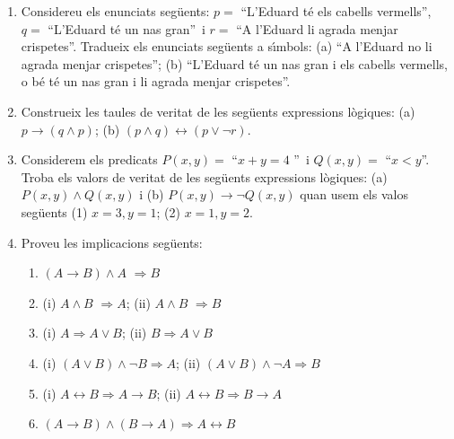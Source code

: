 \begin{enumerate}
\item Considereu els enunciats seg\"{u}ents: $p=$ \textquotedblleft L'Eduard
t\'{e} els cabells vermells\textquotedblright, $q=$ \textquotedblleft L'Eduard
t\'{e} un nas gran\textquotedblright\ i $r=$ \textquotedblleft A l'Eduard li
agrada menjar crispetes\textquotedblright. Tradueix els enunciats seg\"{u}ents
a s\'{\i}mbols: (a) \textquotedblleft A l'Eduard no li agrada menjar
crispetes\textquotedblright; (b) \textquotedblleft L'Eduard t\'{e} un nas gran
i els cabells vermells, o b\'{e} t\'{e} un nas gran i li agrada menjar
crispetes\textquotedblright.

\item Construeix les taules de veritat de les seg\"{u}ents expressions
l\`{o}giques: (a) $p\longrightarrow(q\wedge p)$; (b) $(p\wedge
q)\longleftrightarrow(p\vee\lnot r)$.

\item Considerem els predicats $P(x,y)=$ \textquotedblleft$x+y=4$%
\textquotedblright\ i $Q(x,y)=$ \textquotedblleft$x<y$\textquotedblright.
Troba els valors de veritat de les seg\"{u}ents expressions l\`{o}giques: (a)
$P(x,y)\wedge Q(x,y)$ i (b) $P(x,y)\longrightarrow\lnot Q(x,y)$ quan usem els
valos seg\"{u}ents (1) $x=3,y=1$; (2) $x=1,y=2$.

\item Proveu les implicacions seg\"{u}ents:

\begin{enumerate}
\item $(A\longrightarrow B)\wedge A$ $\Longrightarrow B$

\item (i) $A\wedge B$ $\Longrightarrow A$; (ii) $A\wedge B$ $\Longrightarrow
B$

\item (i) $A\Longrightarrow A\vee B$; (ii) $B\Longrightarrow A\vee B$

\item (i) $\left(  A\vee B\right)  \wedge\lnot B\Longrightarrow A$; (ii)
$\left(  A\vee B\right)  \wedge\lnot A\Longrightarrow B$

\item (i) $A\longleftrightarrow B\Longrightarrow A\longrightarrow B$; (ii)
$A\longleftrightarrow B\Longrightarrow B\longrightarrow A$

\item $\left(  A\longrightarrow B\right)  \wedge\left(  B\longrightarrow
A\right)  \Longrightarrow A\longleftrightarrow B$
\end{enumerate}


\end{enumerate}
